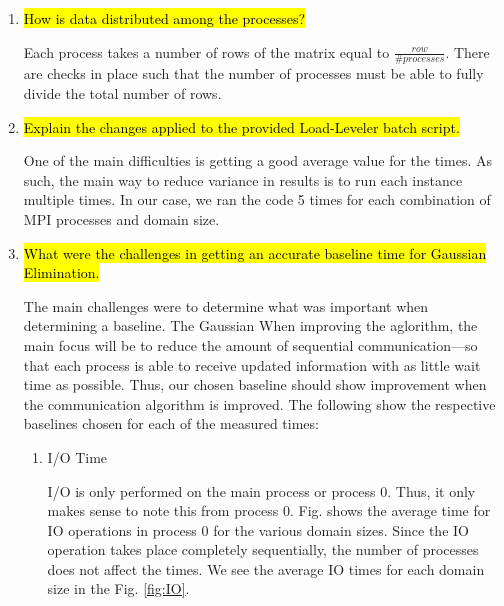 \begin{enumerate}
We ran vampir on the baseline process to observe the blocking \verb!MPI_Send! and \verb!MPI_Recv! functions. This can be seen in Fig. \ref{fig:vampir_baseline}.

 \begin{figure}[h] %
 	\begin{center}
  		\texttt{[image: Baseline/vampir\_baseline.png]} %
  		\caption{Vampir Benchmark}
  		\label{fig:vampir_baseline}
  	\end{center}
 \end{figure}

	\item \hl{How is data distributed among the processes?}

	Each process takes a number of rows of the matrix equal to $\frac{row}{\#processes}$. There are checks in place such that the number of processes must be able to fully divide the total number of rows.

	\item \hl{Explain the changes applied to the provided Load-Leveler batch script.}

	One of the main difficulties is getting a good average value for the times. As such, the main way to reduce variance in results is to run each instance multiple times. In our case, we ran the code 5 times for each combination of MPI processes and domain size.

	\item \hl{What were the challenges in getting an accurate baseline time for Gaussian Elimination.}

	The main challenges were to determine what was important when determining a baseline. The Gaussian When improving the aglorithm, the main focus will be to reduce the amount of sequential communication---so that each process is able to receive updated information with as little wait time as possible. Thus, our chosen baseline should show improvement when the communication algorithm is improved. The following show the respective baselines chosen for each of the measured times:
\begin{enumerate}
	\item I/O Time

	I/O is only performed on the main process or process 0. Thus, it only makes sense to note this from process 0. Fig. shows the average time for IO operations in process 0 for the various domain sizes. Since the IO operation takes place completely sequentially, the number of processes does not affect the times. We see the average IO times for each domain size in the Fig. \ref{fig:IO}.
	

\end{enumerate}
\end{enumerate}
